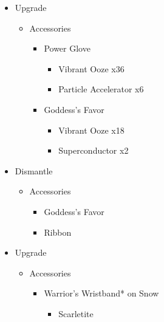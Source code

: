 \begin{upgrade}
	\begin{itemize}
		\item Upgrade
			\begin{itemize}
				\item Accessories
					\begin{itemize}
						\item Power Glove
							\begin{itemize}
								\item Vibrant Ooze x36
								\item Particle Accelerator x6
							\end{itemize}
						\item Goddess's Favor
							\begin{itemize}
								\item Vibrant Ooze x18
								\item Superconductor x2
							\end{itemize}
					\end{itemize}
			\end{itemize}
		\item Dismantle
			\begin{itemize}
				\item Accessories
					\begin{itemize}
						\item Goddess's Favor
						\item Ribbon
					\end{itemize}
			\end{itemize}		
		\item Upgrade
			\begin{itemize}
				\item Accessories
					\begin{itemize}
						\item Warrior's Wristband* on Snow
							\begin{itemize}
								\item Scarletite
							\end{itemize}
					\end{itemize}
			\end{itemize}		
	\end{itemize}
\end{upgrade}

